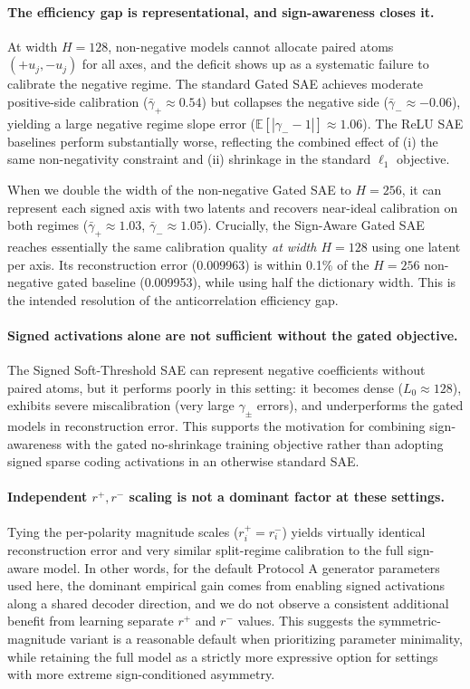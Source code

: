\documentclass{article}
\begin{document}
\paragraph{The efficiency gap is representational, and sign-awareness closes it.}
At width $H=128$, non-negative models cannot allocate paired atoms $(+u_j,-u_j)$ for all axes, and the deficit shows up as a
systematic failure to calibrate the negative regime. The standard Gated SAE achieves moderate positive-side calibration
($\bar{\gamma}_+ \approx 0.54$) but collapses the negative side ($\bar{\gamma}_- \approx -0.06$), yielding a large negative
regime slope error ($\mathbb{E}[|\gamma_--1|]\approx 1.06$). The ReLU SAE baselines perform substantially worse, reflecting the
combined effect of (i) the same non-negativity constraint and (ii) shrinkage in the standard $\ell_1$ objective.

When we double the width of the non-negative Gated SAE to $H=256$, it can represent each signed axis with two latents and
recovers near-ideal calibration on both regimes ($\bar{\gamma}_+\approx 1.03$, $\bar{\gamma}_-\approx 1.05$).
Crucially, the Sign-Aware Gated SAE reaches essentially the same calibration quality \emph{at width $H=128$} using one latent
per axis. Its reconstruction error (0.009963) is within 0.1\% of the $H=256$ non-negative gated baseline (0.009953), while
using half the dictionary width. This is the intended resolution of the anticorrelation efficiency gap.

\paragraph{Signed activations alone are not sufficient without the gated objective.}
The Signed Soft-Threshold SAE can represent negative coefficients without paired atoms, but it performs poorly in this setting:
it becomes dense ($L_0\approx 128$), exhibits severe miscalibration (very large $\gamma_\pm$ errors), and underperforms the
gated models in reconstruction error. This supports the motivation for combining sign-awareness with the gated no-shrinkage
training objective rather than adopting signed sparse coding activations in an otherwise standard SAE.

\paragraph{Independent $r^+,r^-$ scaling is not a dominant factor at these settings.}
Tying the per-polarity magnitude scales ($r_i^+=r_i^-$) yields virtually identical reconstruction error and very similar
split-regime calibration to the full sign-aware model. In other words, for the default Protocol A generator parameters used
here, the dominant empirical gain comes from enabling signed activations along a shared decoder direction, and we do not
observe a consistent additional benefit from learning separate $r^+$ and $r^-$ values. This suggests the symmetric-magnitude
variant is a reasonable default when prioritizing parameter minimality, while retaining the full model as a strictly more
expressive option for settings with more extreme sign-conditioned asymmetry.
\end{document}
